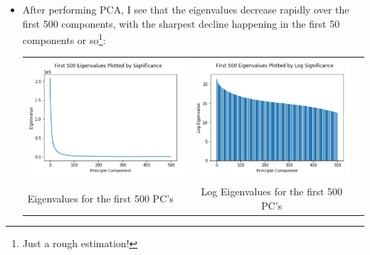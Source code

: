 \documentclass[submit]{harvardml}
\begin{document}
\begin{itemize}

\item After performing PCA, I see that the eigenvalues decrease rapidly over the first 500 components, with the sharpest decline happening in the first 50 components or so\footnote{Just a rough estimation!}:

\begin{center}

\begin{tabular}{ l c r }
  \includegraphics[scale=0.5]{eigenvalues.png} & \includegraphics[scale=0.5]{log_eigenvalues.png} \\
  Eigenvalues for the first 500 PC's  & Log Eigenvalues for the first 500 PC's \\
\end{tabular}


\end{center}
\end{itemize}
\end{document}
